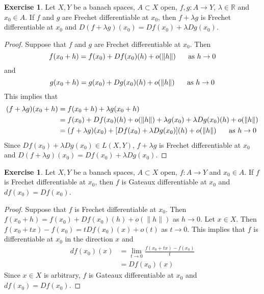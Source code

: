 \documentclass[12pt]{amsart}
\theoremstyle{definition}
\theoremstyle{remark}
\theoremstyle{definition}
\newtheorem{ex}[definition]{Exercise}
\newcommand{\lam}{\lambda}
\newcommand{\R}{\mathbb{R}}
\begin{document}
	\begin{ex}
	Let $X, Y$ be a banach spaces, $A \subset X$ open, $f,g:A \rightarrow Y$, $\lam \in \R$ and $x_0 \in A$. If $f$ and $g$ are Frechet differentiable at $x_0$, then $f+ \lam g$ is Frechet differentiable at $x_0$ and $D(f+\lam g)(x_0) = Df(x_0) + \lam Dg(x_0)$.
	\end{ex}
	
	\begin{proof}
	Suppose that $f$ and $g$ are Frechet differentiable at $x_0$. Then $$f(x_0 + h) = f(x_0) + Df(x_0)(h) + o(\|h\| ) \hspace{.5cm} \text{ as } h \rightarrow 0$$  and $$g(x_0 + h) = g(x_0) + Dg(x_0)(h) + o(\|h\| ) \hspace{.5cm} \text{ as } h \rightarrow 0$$  
	This implies that 
	\begin{align*}
	(f+\lam g)(x_0 + h) 
	&= f(x_0 + h) +\lam g(x_0 + h) \\
	&= f(x_0) + Df(x_0)(h) + o(\|h\| ) + \lam g(x_0) + \lam Dg(x_0)(h) + o(\|h\| ) \\
	&= (f+\lam g)(x_0) + [Df(x_0)+ \lam Dg(x_0)](h) + o(\|h\|) \hspace{.5cm} \text{ as } h \rightarrow 0
	\end{align*}
	Since $Df(x_0)+\lam Dg(x_0) \in L(X,Y)$, $f+\lam g$ is Frechet differentiable at $x_0$ and $D(f+\lam g)(x_0) = Df(x_0) + \lam Dg(x_0)$. 
	\end{proof}
	
	\begin{ex}
	Let $X, Y$ be a banach spaces, $A \subset X$ open, $f:A \rightarrow Y$ and $x_0 \in A$. If $f$ is Frechet differentiable at $x_0$, then $f$ is Gateaux differentiable at $x_0$ and $df(x_0) = Df(x_0)$.
	\end{ex}
	
	\begin{proof}
	Suppose that $f$ is Frechet differentiable at $x_0$. Then $f(x_0 + h) = f(x_0) + Df(x_0)(h) + o(\|h\| )$ as $h \rightarrow 0$. Let $x \in X$. Then $f(x_0 + tx) - f(x_0) = tDf(x_0)(x) + o(t)$ as $t \rightarrow 0$. This implies that $f$ is differentiable at $x_0$ in the direction $x$ and 
	\begin{align*}
	df(x_0)(x) 
	&= \lim_{t \rightarrow 0} \frac{f(x_0 + tx) - f(x_0)}{t} \\
	&= Df(x_0)(x)
	\end{align*}
	Since $x \in X$ is arbitrary, $f$ is Gateaux differentiable at $x_0$ and $df(x_0) = Df(x_0)$.
	\end{proof}
	
\end{document}

